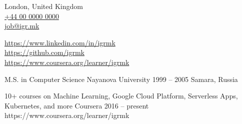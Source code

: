 \documentclass[9pt,a4paper]{juicv}
\newcommand{\myphone}{\href{tel:+440000000000}{+44 00 0000 0000}}
\begin{document}
\begin{paracol}{2}
\newpage
\switchcolumn
\raggedright

    London, United Kingdom\\
    \myphone\\
    \href{mailto:job@igr.mk}{job@igr.mk}

    \vspace{6pt}
    {
        \small
        \href{https://www.linkedin.com/in/igrmk}{https://www.linkedin.com/in/igrmk}\\
        \href{https://github.com/igrmk}{https://github.com/igrmk}\\
        \href{https://www.coursera.org/learner/igrmk}{https://www.coursera.org/learner/igrmk}
        \par
    }


    \vspace{6pt}
    {
        \cvTag{\LaTeX}
    }

    \cvRightEventNoBody
        {M.S. in Computer Science}
        {Nayanova University}
        {1999 -- 2005}
        {Samara, Russia}
        {}

    \cvRightEventNoBody
        {10+ courses on Machine Learning, Google Cloud Platform, Serverless Apps, Kubernetes, and more}
        {Coursera}
        {2016 -- present}
        {}
        {https://www.coursera.org/learner/igrmk}

\end{paracol}
\end{document}
